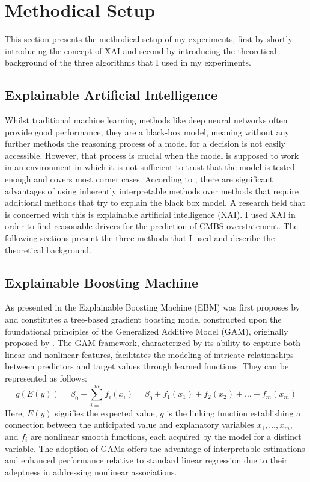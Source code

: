 \documentclass{article}
\begin{document}
\section{Methodical Setup}
This section presents the methodical setup of my experiments, first by shortly introducing the concept of XAI and second by introducing the theoretical background of the three algorithms that I used in my experiments.
\subsection{Explainable Artificial Intelligence}
Whilst traditional machine learning methods like deep neural networks often provide good performance, they are a black-box model, meaning without any further methods the reasoning process of a model for a decision is not easily accessible.
However, that process is crucial when the model is supposed to work in an environment in which it is not sufficient to trust that the model is tested enough and covers most corner cases.
According to \cite{Rudin2019}, there are significant advantages of using inherently interpretable methods over methods that require additional methods that try to explain the black box model.
A research field that is concerned with this is explainable artificial intelligence (XAI).
I used XAI in order to find reasonable drivers for the prediction of CMBS overstatement.
The following sections present the three methods that I used and describe the theoretical background.

\subsection{Explainable Boosting Machine}
As presented in \cite{nazemi2022interpretable} the Explainable Boosting Machine (EBM) was first proposes by \cite{nori2019interpretable} and constitutes a tree-based gradient boosting model constructed upon the foundational principles of the Generalized Additive Model (GAM), originally proposed by \cite{hastie1986generalized}. The GAM framework, characterized by its ability to capture both linear and nonlinear features, facilitates the modeling of intricate relationships between predictors and target values through learned functions. They can be represented as follows:
\begin{equation}
g(E(y)) = \beta_0 + \sum_{i=1}^{m} f_i(x_i) = \beta_0 + f_1(x_1) + f_2(x_2) + \dots + f_m(x_m)
\end{equation}
Here, \(E(y)\) signifies the expected value, \(g\) is the linking function establishing a connection between the anticipated value and explanatory variables \(x_1, \ldots, x_m\), and \(f_i\) are nonlinear smooth functions, each acquired by the model for a distinct variable. The adoption of GAMs offers the advantage of interpretable estimations and enhanced performance relative to standard linear regression due to their adeptness in addressing nonlinear associations. \cite{nazemi2022interpretable}
\end{document}

